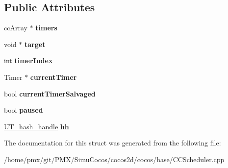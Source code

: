 \subsection*{Public Attributes}
\begin{DoxyCompactItemize}
\item 
\mbox{\label{struct__hashSelectorEntry_af2d937e91681f579d0fd5ae08a77dac0}} 
cc\+Array $\ast$ {\bfseries timers}
\item 
\mbox{\label{struct__hashSelectorEntry_a72a517c7822964743801ae696bc3ad3d}} 
void $\ast$ {\bfseries target}
\item 
\mbox{\label{struct__hashSelectorEntry_a1fc9d1f9933c07afe214462de879347b}} 
int {\bfseries timer\+Index}
\item 
\mbox{\label{struct__hashSelectorEntry_a889a0627caee95fc97bb06bab68499b4}} 
Timer $\ast$ {\bfseries current\+Timer}
\item 
\mbox{\label{struct__hashSelectorEntry_a92dd7cdc1a34bde5fb92794beec9a56f}} 
bool {\bfseries current\+Timer\+Salvaged}
\item 
\mbox{\label{struct__hashSelectorEntry_a3abdfd03a00173d13d1138c15f0bf8e0}} 
bool {\bfseries paused}
\item 
\mbox{\label{struct__hashSelectorEntry_ad007cfdf3a7df8672a9c6901e70c97ea}} 
\hyperlink{structUT__hash__handle}{U\+T\+\_\+hash\+\_\+handle} {\bfseries hh}
\end{DoxyCompactItemize}


The documentation for this struct was generated from the following file\+:\begin{DoxyCompactItemize}
\item 
/home/pmx/git/\+P\+M\+X/\+Simu\+Cocos/cocos2d/cocos/base/C\+C\+Scheduler.\+cpp\end{DoxyCompactItemize}
